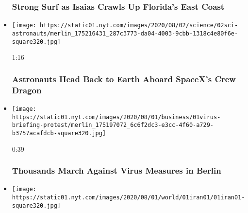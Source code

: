 \begin{itemize}
  \hypertarget{strong-surf-as-isaias-crawls-up-floridas-east-coast}{%
  \subsubsection{Strong Surf as Isaias Crawls Up Florida's East
  Coast}\label{strong-surf-as-isaias-crawls-up-floridas-east-coast}}
\item
  \href{https://www.nytimes.com/video/us/100000007268936/spacex-departs-international-space-station.html?action=click\&module=video-series-bar\&region=header\&pgtype=Article\&playlistId=video/latest-video}{}

  \texttt{[image: https://static01.nyt.com/images/2020/08/02/science/02sci-astronauts/merlin\_175216431\_287c3773-da04-4003-9cbb-1318c4e80f6e-square320.jpg]}

  1:16

  \hypertarget{astronauts-head-back-to-earth-aboard-spacexs-crew-dragon}{%
  \subsubsection{Astronauts Head Back to Earth Aboard SpaceX's Crew
  Dragon}\label{astronauts-head-back-to-earth-aboard-spacexs-crew-dragon}}
\item
  \href{https://www.nytimes.com/video/world/europe/100000007268465/coronavirus-protest-germany.html?action=click\&module=video-series-bar\&region=header\&pgtype=Article\&playlistId=video/latest-video}{}

  \texttt{[image: https://static01.nyt.com/images/2020/08/01/business/01virus-briefing-protest/merlin\_175197072\_6c6f2dc3-e3cc-4f60-a729-b3757acafdcb-square320.jpg]}

  0:39

  \hypertarget{thousands-march-against-virus-measures-in-berlin}{%
  \subsubsection{Thousands March Against Virus Measures in
  Berlin}\label{thousands-march-against-virus-measures-in-berlin}}
\item
  \href{https://www.nytimes.com/video/world/middleeast/100000007268443/iran-united-states-nuclear-program-negotiation.html?action=click\&module=video-series-bar\&region=header\&pgtype=Article\&playlistId=video/latest-video}{}

  \texttt{[image: https://static01.nyt.com/images/2020/08/01/world/01iran01/01iran01-square320.jpg]}


\end{itemize}
